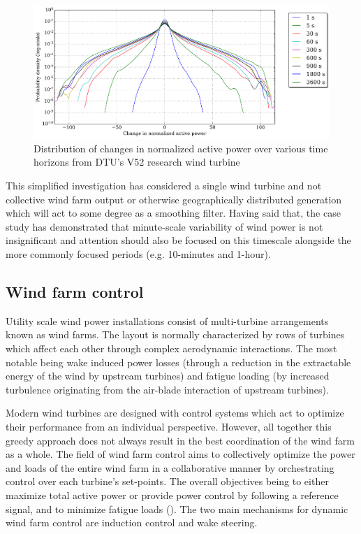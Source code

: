 \begin{figure}[htbp]
    \centering
        \includegraphics[width=1.0\textwidth]{graphics/intro/variability/norm_act_pow_error_dist.png}
    \caption{Distribution of changes in normalized active power over various time horizons from DTU's V52 research wind turbine}
    \label{fig:norm_act_pow_error_dist}
\end{figure}

This simplified investigation has considered a single wind turbine and not collective wind farm output or otherwise geographically distributed generation which will act to some degree as a smoothing filter. Having said that, the case study has demonstrated that minute-scale variability of wind power is not insignificant and attention should also be focused on this timescale alongside the more commonly focused periods (e.g. 10-minutes and 1-hour).

\clearpage
\subsection{Wind farm control}
\label{sec:intro_control}

Utility scale wind power installations consist of multi-turbine arrangements known as wind farms. The layout is normally characterized by rows of turbines which affect each other through complex aerodynamic interactions. The most notable being wake induced power losses (through a reduction in the extractable energy of the wind by upstream turbines) and fatigue loading (by increased turbulence originating from the air-blade interaction of upstream turbines).

Modern wind turbines are designed with control systems which act to optimize their performance from an individual perspective. However, all together this greedy approach does not always result in the best coordination of the wind farm as a whole. The field of wind farm control aims to collectively optimize the power and loads of the entire wind farm in a collaborative manner by orchestrating control over each turbine's set-points. The overall objectives being to either maximize total active power or provide power control by following a reference signal, and to minimize fatigue loads (\cite{knudsen_survey_2015}). The two main mechanisms for dynamic wind farm control are induction control and wake steering.

